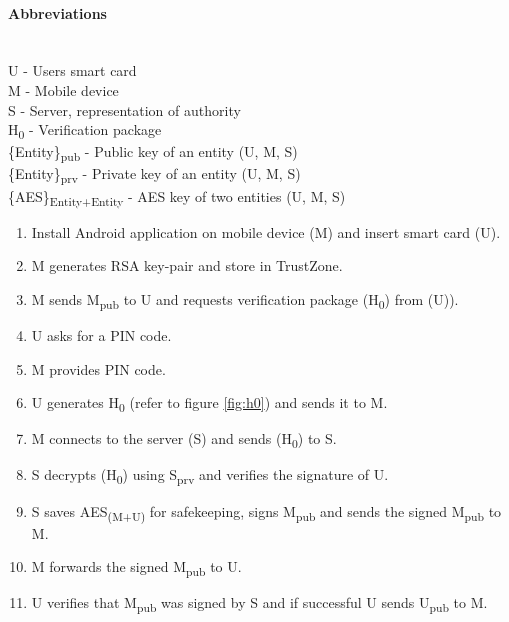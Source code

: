 \paragraph{Abbreviations}\mbox{}\\
U - Users smart card \\
M - Mobile device \\
S - Server, representation of authority \\
H\textsubscript{0} - Verification package \\
\{Entity\}\textsubscript{pub} - Public key of an entity (U, M, S)\\
\{Entity\}\textsubscript{prv} - Private key of an entity (U, M, S)\\
\{AES\}\textsubscript{Entity+Entity} - AES key of two entities (U, M, S)\\


\begin{enumerate}
  \item Install Android application on mobile device (M) and insert smart card (U).
  \item M generates RSA key-pair and store in TrustZone.
  \item M sends M\textsubscript{pub} to U and requests verification package (H\textsubscript{0}) from (U)).
  \item U asks for a PIN code.
  \item M provides PIN code.
  \item U generates H\textsubscript{0} (refer to figure \ref{fig:h0}) and sends it to M.
  \item M connects to the server (S) and sends (H\textsubscript{0}) to S.
  \item S decrypts (H\textsubscript{0}) using S\textsubscript{prv} and verifies the signature of U.
  \item S saves AES\textsubscript{(M+U)} for safekeeping, signs M\textsubscript{pub} and sends the signed  M\textsubscript{pub} to M.
  \item M forwards the signed M\textsubscript{pub} to U.
  \item U verifies that M\textsubscript{pub} was signed by S and if successful U sends U\textsubscript{pub} to M.
\end{enumerate}

